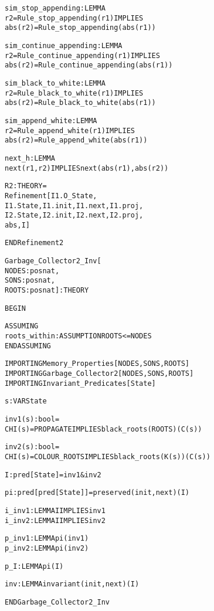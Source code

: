 \begin{alltt}
  sim_stop_appending : LEMMA
    r2 = Rule_stop_appending(r1) IMPLIES
      abs(r2) = Rule_stop_appending(abs(r1))

  sim_continue_appending : LEMMA
    r2 = Rule_continue_appending(r1) IMPLIES
      abs(r2) = Rule_continue_appending(abs(r1))

  sim_black_to_white : LEMMA
    r2 = Rule_black_to_white(r1) IMPLIES
      abs(r2) = Rule_black_to_white(abs(r1))

  sim_append_white : LEMMA
    r2 = Rule_append_white(r1) IMPLIES
      abs(r2) = Rule_append_white(abs(r1))

  next_h : LEMMA 
    next(r1,r2) IMPLIES next(abs(r1),abs(r2))

  R2 : THEORY = 
    Refinement[I1.O_State,
      I1.State,I1.init,I1.next,I1.proj,
      I2.State,I2.init,I2.next,I2.proj,
      abs,I]      

END Refinement2
\end{alltt}


\newpage
\begin{alltt}
%%%%%%%%%%%%%%%%%%%%%%%%%%%%%%%%%%%%%%%%%%%%%%%%%%%%%%%%%%%%%%%%%%%
% Garbage_Collector2_Inv :                                        %
%   Defines all invariants used in proving the second refinement. %
%%%%%%%%%%%%%%%%%%%%%%%%%%%%%%%%%%%%%%%%%%%%%%%%%%%%%%%%%%%%%%%%%%%

Garbage_Collector2_Inv[
  NODES : posnat, 
  SONS  : posnat, 
  ROOTS : posnat] : THEORY

BEGIN

  ASSUMING
    roots_within : ASSUMPTION ROOTS <= NODES
  ENDASSUMING

  IMPORTING Memory_Properties[NODES,SONS,ROOTS]
  IMPORTING Garbage_Collector2[NODES,SONS,ROOTS]
  IMPORTING Invariant_Predicates[State]

  s : VAR State

  inv1(s):bool =
    CHI(s)=PROPAGATE IMPLIES black_roots(ROOTS)(C(s))

  inv2(s):bool =
    CHI(s)=COLOUR_ROOTS IMPLIES black_roots(K(s))(C(s))

  I : pred[State] = inv1 & inv2

  pi : pred[pred[State]] = preserved(init,next)(I)

  i_inv1 : LEMMA I IMPLIES inv1
  i_inv2 : LEMMA I IMPLIES inv2

  p_inv1 : LEMMA pi(inv1)
  p_inv2 : LEMMA pi(inv2)

  p_I : LEMMA pi(I)

  inv : LEMMA invariant(init,next)(I)

END Garbage_Collector2_Inv
\end{alltt}


